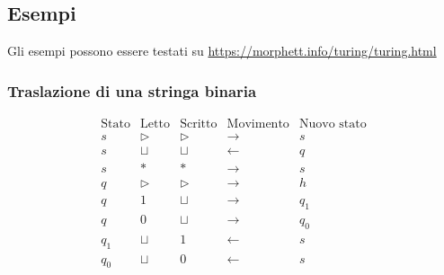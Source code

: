 \subsection{Esempi}
Gli esempi possono essere testati su \url{https://morphett.info/turing/turing.html}

\subsubsection{Traslazione di una stringa binaria}
\label{example:shift}
\[
\begin{array}{c|c|c|c|c}
\text{Stato} & \text{Letto} & \text{Scritto} & \text{Movimento} & \text{Nuovo stato} \\ \hline
s   & \triangleright & \triangleright & \rightarrow & s \\
s   & \sqcup         & \sqcup         & \leftarrow  & q \\
s   & *              & *              & \rightarrow & s \\
q   & \triangleright & \triangleright & \rightarrow & h \\
q   & 1              & \sqcup         & \rightarrow & q_1 \\
q   & 0              & \sqcup         & \rightarrow & q_0 \\
q_1 & \sqcup         & 1              & \leftarrow  & s \\
q_0 & \sqcup         & 0              & \leftarrow  & s
\end{array}
\]
